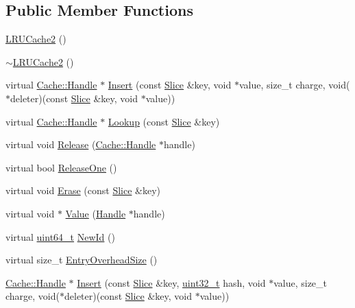\subsection*{Public Member Functions}
\begin{DoxyCompactItemize}
\item 
\hyperlink{classleveldb_1_1_l_r_u_cache2_a67cb2fda9b642c8d35f081d0a016d8ad}{L\+R\+U\+Cache2} ()
\item 
\hyperlink{classleveldb_1_1_l_r_u_cache2_a32f72b8eb44742e2546520c65f5b70d9}{$\sim$\+L\+R\+U\+Cache2} ()
\item 
virtual \hyperlink{structleveldb_1_1_cache_1_1_handle}{Cache\+::\+Handle} $\ast$ \hyperlink{classleveldb_1_1_l_r_u_cache2_ac10060719542d8fa0687a629717c4f80}{Insert} (const \hyperlink{classleveldb_1_1_slice}{Slice} \&key, void $\ast$value, size\+\_\+t charge, void($\ast$deleter)(const \hyperlink{classleveldb_1_1_slice}{Slice} \&key, void $\ast$value))
\item 
virtual \hyperlink{structleveldb_1_1_cache_1_1_handle}{Cache\+::\+Handle} $\ast$ \hyperlink{classleveldb_1_1_l_r_u_cache2_a37f8596ded603ec2cd6a7146ff9193fa}{Lookup} (const \hyperlink{classleveldb_1_1_slice}{Slice} \&key)
\item 
virtual void \hyperlink{classleveldb_1_1_l_r_u_cache2_a2deaa4b311f24b275f6e60e4342f976c}{Release} (\hyperlink{structleveldb_1_1_cache_1_1_handle}{Cache\+::\+Handle} $\ast$handle)
\item 
virtual bool \hyperlink{classleveldb_1_1_l_r_u_cache2_a43fb9c4585a4ba1ac11e3b210149a0a5}{Release\+One} ()
\item 
virtual void \hyperlink{classleveldb_1_1_l_r_u_cache2_aa786830fccda48502c9c5acaf4fa9d4e}{Erase} (const \hyperlink{classleveldb_1_1_slice}{Slice} \&key)
\item 
virtual void $\ast$ \hyperlink{classleveldb_1_1_l_r_u_cache2_aa6a82f707967dd7fe36395deec961930}{Value} (\hyperlink{structleveldb_1_1_cache_1_1_handle}{Handle} $\ast$handle)
\item 
virtual \hyperlink{stdint_8h_aaa5d1cd013383c889537491c3cfd9aad}{uint64\+\_\+t} \hyperlink{classleveldb_1_1_l_r_u_cache2_a51669ad9e852e3f90a3921cede4e7bc6}{New\+Id} ()
\item 
virtual size\+\_\+t \hyperlink{classleveldb_1_1_l_r_u_cache2_afb740119ac2bef76fdf6319475157a4b}{Entry\+Overhead\+Size} ()
\item 
\hyperlink{structleveldb_1_1_cache_1_1_handle}{Cache\+::\+Handle} $\ast$ \hyperlink{classleveldb_1_1_l_r_u_cache2_ab2ddcda6b5b60523272e319440a19b49}{Insert} (const \hyperlink{classleveldb_1_1_slice}{Slice} \&key, \hyperlink{stdint_8h_a435d1572bf3f880d55459d9805097f62}{uint32\+\_\+t} hash, void $\ast$value, size\+\_\+t charge, void($\ast$deleter)(const \hyperlink{classleveldb_1_1_slice}{Slice} \&key, void $\ast$value))

\end{DoxyCompactItemize}
